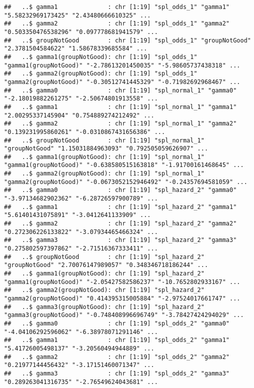 \documentclass[
]{article}
\begin{document}
\begin{verbatim}
##   ..$ gamma1              : chr [1:19] "spl_odds_1" "gamma1" "5.58232969173425" "2.43480666610325" ...
##   ..$ gamma2              : chr [1:19] "spl_odds_1" "gamma2" "0.503350476538296" "0.097778681941579" ...
##   ..$ groupNotGood        : chr [1:19] "spl_odds_1" "groupNotGood" "2.3781504584622" "1.58678339685584" ...
##   ..$ gamma1(groupNotGood): chr [1:19] "spl_odds_1" "gamma1(groupNotGood)" "-2.78613201450035" "-5.98605737438318" ...
##   ..$ gamma2(groupNotGood): chr [1:19] "spl_odds_1" "gamma2(groupNotGood)" "-0.30512741445329" "-0.71982692968467" ...
##   ..$ gamma0              : chr [1:19] "spl_normal_1" "gamma0" "-2.18019882261275" "-2.50674801913558" ...
##   ..$ gamma1              : chr [1:19] "spl_normal_1" "gamma1" "2.00295337145904" "0.754889274212492" ...
##   ..$ gamma2              : chr [1:19] "spl_normal_1" "gamma2" "0.139231995860261" "-0.0310867431656386" ...
##   ..$ groupNotGood        : chr [1:19] "spl_normal_1" "groupNotGood" "1.15031884963093" "0.792505059626907" ...
##   ..$ gamma1(groupNotGood): chr [1:19] "spl_normal_1" "gamma1(groupNotGood)" "-0.638580515163818" "-1.91700161468645" ...
##   ..$ gamma2(groupNotGood): chr [1:19] "spl_normal_1" "gamma2(groupNotGood)" "-0.0673052152946492" "-0.24357694581059" ...
##   ..$ gamma0              : chr [1:19] "spl_hazard_2" "gamma0" "-3.97134682902362" "-6.28726597900789" ...
##   ..$ gamma1              : chr [1:19] "spl_hazard_2" "gamma1" "5.61401431075891" "-3.0412641133909" ...
##   ..$ gamma2              : chr [1:19] "spl_hazard_2" "gamma2" "0.272306226133822" "-3.07934465466324" ...
##   ..$ gamma3              : chr [1:19] "spl_hazard_2" "gamma3" "0.275802597397862" "-2.71516367333411" ...
##   ..$ groupNotGood        : chr [1:19] "spl_hazard_2" "groupNotGood" "2.70076147989057" "0.348346718186244" ...
##   ..$ gamma1(groupNotGood): chr [1:19] "spl_hazard_2" "gamma1(groupNotGood)" "-2.05427582586237" "-10.7652802933167" ...
##   ..$ gamma2(groupNotGood): chr [1:19] "spl_hazard_2" "gamma2(groupNotGood)" "0.414395315005884" "-2.97524017661747" ...
##   ..$ gamma3(groupNotGood): chr [1:19] "spl_hazard_2" "gamma3(groupNotGood)" "-0.748408996696749" "-3.78427424294029" ...
##   ..$ gamma0              : chr [1:19] "spl_odds_2" "gamma0" "-4.04106292596062" "-6.38978071291146" ...
##   ..$ gamma1              : chr [1:19] "spl_odds_2" "gamma1" "5.41726005498137" "-3.20560494944889" ...
##   ..$ gamma2              : chr [1:19] "spl_odds_2" "gamma2" "0.21977144456432" "-3.17151460071347" ...
##   ..$ gamma3              : chr [1:19] "spl_odds_2" "gamma3" "0.289263041316735" "-2.76549624043681" ...

\end{verbatim}
\end{document}

